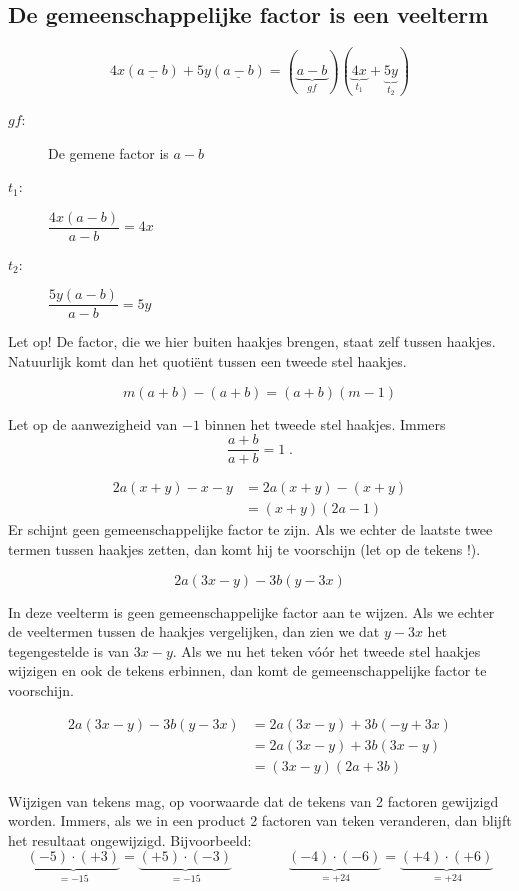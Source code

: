 \documentclass{bis}
\begin{document}
\subsection{De gemeenschappelijke factor is een veelterm}

\begin{voorbeeld}
\[4x (\underline{a - b}) + 5y (\underline{a - b}) = (\underbrace{a - b}_{gf}) (\underbrace{4x}_{t_1} + \underbrace{5y}_{t_2})\]

\begin{description}
  \item[$gf$:] De gemene factor is $a-b$
  \item[$t_1$:] $\dfrac{4x(a-b)}{a-b}=4x$
  \item[$t_2$:] $\dfrac{5y(a-b)}{a-b}=5y$
\end{description}

Let op! De factor, die we hier buiten haakjes brengen, staat zelf tussen haakjes. Natuurlijk komt dan het quotiënt tussen een tweede stel haakjes.
\end{voorbeeld}

\begin{voorbeeld}
\[m (a + b) - (a + b) = (a + b) (m - 1)\]

Let op de aanwezigheid van $-1$ binnen het tweede stel haakjes. Immers
\[\dfrac{a+b}{a+b}=1\;.\]
\end{voorbeeld}

\begin{voorbeeld}
\begin{align*}
  2a (x + y) - x - y &= 2a (x + y) - (x + y)\\
                     &= (x + y) (2a - 1)
\end{align*}
Er schijnt geen gemeenschappelijke factor te zijn. Als we echter de laatste twee termen tussen haakjes zetten, dan komt hij te voorschijn (let op de tekens !).
\end{voorbeeld}

\begin{voorbeeld}
\[2a (3x - y) - 3b (y - 3x)\]

In deze veelterm is geen gemeenschappelijke factor aan te wijzen. Als we echter de veeltermen tussen de haakjes vergelijken, dan zien we dat $y - 3x$ het tegengestelde is van $3x - y$. Als we nu het teken vóór het tweede stel haakjes wijzigen en ook de tekens erbinnen, dan komt de gemeenschappelijke factor te voorschijn.

\begin{align*}
  2a (3x - y) - 3b (y - 3x) &= 2a (3x - y) + 3b (- y + 3x)\\
                            &= 2a (3x - y) + 3b (3x - y)\\
                            &= (3x - y) (2a + 3b)
\end{align*}

Wijzigen van tekens mag, op voorwaarde dat de tekens van 2 factoren gewijzigd worden. Immers, als we in een product 2 factoren van teken veranderen, dan blijft het resultaat ongewijzigd. Bijvoorbeeld:
\[\underbrace{(-5)\cdot(+3)}_{=-15}=\underbrace{(+5)\cdot(-3)}_{=-15} \qquad\qquad
  \underbrace{(-4)\cdot(-6)}_{=+24}=\underbrace{(+4)\cdot(+6)}_{=+24}\]
\end{voorbeeld}
\end{document}
